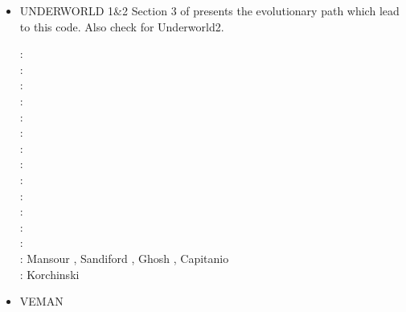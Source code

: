 \begin{itemize}
\item {\codefont UNDERWORLD 1\&2} 
Section 3 of \cite{qums07} presents the evolutionary path which lead to this code.
Also check \cite{magm20} for Underworld2. 

\begin{scriptsize}
\twothousandsix: \cite{stfs06}\cite{momu06}\\
\twothousandseven: \cite{moql07}\cite{stfs07}\cite{qums07}\\
\twothousandeight: \cite{lemm08}\cite{ozrs08}\cite{gotc08}\cite{stmt08}\cite{scsf11}\\
\twothousandten: \cite{casm10}\cite{mamb10}\cite{stsf10}\cite{stfc10}\cite{fasm10}\cite{cazf10}\\
\twothousandeleven: \cite{memm11}\cite{cafz11}\\
\twothousandtwelve: \cite{cafa12}\\
\twothousandthirteen: \cite{bemm12}\cite{scmo13}\cite{faca13}\cite{care13}\cite{coml13}\\
\twothousandfourteen: \cite{famc14}\cite{shjm14}\\
\twothousandfifteen: \cite{quxm15}\cite{bemm15}\cite{scsp15}\cite{shmj15}\cite{carr15}\\
\twothousandsixteen: \cite{shmv16}\cite{onlw16}\cite{kicf16}\\
\twothousandseventeen: \cite{bems17}\cite{kicf17}\cite{sche17}\cite{wakc17}\\
\twothousandeighteen: \cite{memm18}\cite{yamz18}\cite{bemc18}\cite{mord18}\\
\twothousandnineteen: \cite{samo19}\cite{yamg19}\cite{canc19}\cite{cakc19}\cite{sams19b}\cite{bore19}\\
\twothousandtwenty: Mansour \etal \cite{magm20}, Sandiford \etal \cite{sams20}, 
                    Ghosh \etal \cite{ghbm20}, Capitanio \etal \cite{canc20}\\
\twothousandtwentyone: Korchinski \etal \cite{kotr21}
\end{scriptsize}

\item {\codefont VEMAN}

\begin{scriptsize}
\cite{bepo10}
\end{scriptsize}

\end{itemize}

